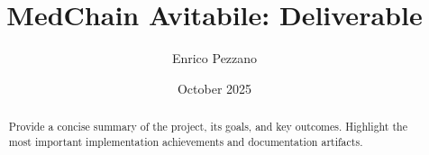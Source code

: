 \documentclass[11pt,a4paper]{article}
\title{MedChain Avitabile: Deliverable}
\author{Enrico Pezzano}
\date{October 2025}
\begin{document}
\maketitle

\begin{abstract}
Provide a concise summary of the project, its goals, and key outcomes. Highlight the most important implementation achievements and documentation artifacts.
\end{abstract}

\tableofcontents
\newpage









\nocite{botta2022towards,ateniese2017redactable,avitabile2024data}



\end{document}
